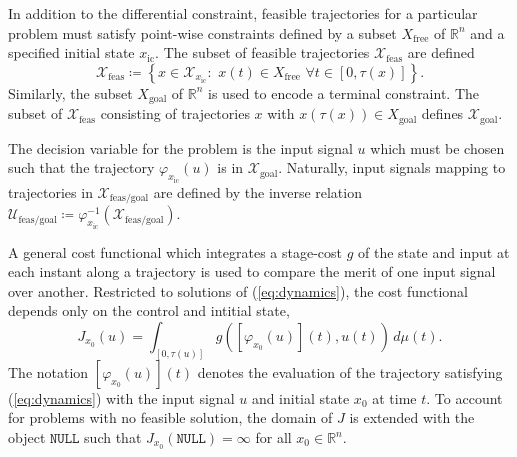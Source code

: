 \documentclass{llncs}
\newcommand{\NULL}{\ensuremath{\mathtt{NULL}}\xspace}
\newcommand{\mcmargin}[2]{{\color{red}#1}\marginpar{\raggedright\footnotesize\color{red}[MC] #2}}
\begin{document}
In addition to the differential constraint, feasible trajectories for a particular problem must satisfy point-wise constraints defined by a subset $X_\mathrm{free}$ of $\mathbb{R}^n$ and a specified initial state $x_\mathrm{ic}$. 
%
The subset of feasible trajectories $\mathcal{X}_\mathrm{feas}$ \mcmargin{are}{is} defined 
%
\begin{equation}
\mathcal{X}_\mathrm{feas}\coloneqq \left\{ x\in \mathcal{X}_{x_\mathrm{ic}}:\,\, x(t)\in X_\mathrm{free}\,\, \forall t\in [0,\tau (x)] \right\}.
\end{equation}
%
Similarly, the subset $X_\mathrm{goal}$ of $\mathbb{R}^n$  is used to encode a terminal constraint. The subset of $\mathcal{X}_\mathrm{feas}$ consisting of trajectories $x$ with $x(\tau(x))\in X_\mathrm{goal}$ defines $\mathcal{X}_\mathrm{goal}$.
%
% 
%

%
The decision variable for the problem is the input signal $u$ which must be chosen such that the trajectory $\varphi_{x_\mathrm{ic}}(u)$ is in $\mathcal{X}_\mathrm{goal}$.
%
Naturally, input signals mapping to trajectories in $\mathcal{X}_\mathrm{feas/goal}$ are defined by the inverse relation  $\mathcal{U}_\mathrm{feas/goal} \coloneqq \varphi_{x_\mathrm{ic}}^{-1}(\mathcal{X}_\mathrm{feas/goal})$. 

A general cost functional which integrates a \mcmargin{stage-cost}{define what is stage cost} $g$ of the state and input at each instant along a trajectory is used to compare the merit of one input signal over another.
%
Restricted to solutions of (\ref{eq:dynamics}), the cost functional depends only on the control and intitial state, 
%
\begin{equation}
J_{x_{0}}(u)=\int_{[0,\tau(u)]}g([\varphi_{x_{0}}(u)](t),u(t))\, d\mu(t).\label{eq:real_cost}
\end{equation}
%
The notation $[\varphi_{x_{0}}(u)](t)$ denotes the evaluation of the trajectory satisfying (\ref{eq:dynamics}) with the input signal $u$ and initial state $x_{0}$ at time $t$. 
%
To account for problems with no feasible solution, the domain of $J$ is extended with the object \NULL such that $J_{x_0}(\NULL)=\infty$ for all $x_0\in\mathbb{R}^{n}$.
\end{document}

